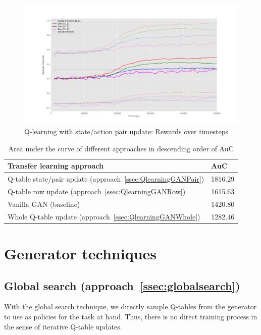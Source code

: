 \begin{figure}[H]
\centering
\includegraphics[width=15cm]{Figures/QlearningGANAllDiscrim}
\caption{Q-learning with state/action pair update: Rewards over timesteps}
\label{fig:QlearningGANAllDiscrim}
\end{figure}


\begin{table}[H]
\centering
\begin{tabular}{@{}ll@{}}
\toprule
Transfer learning approach & AuC     \\ \midrule
Q-table state/pair update (approach~\ref{ssec:QlearningGANPair})  & 1816.29 \\
Q-table row update (approach~\ref{ssec:QlearningGANRow})        & 1615.63 \\
Vanilla GAN (baseline)     & 1420.80 \\
Whole Q-table update (approach~\ref{ssec:QlearningGANWhole})      & 1282.46 \\ \bottomrule
\end{tabular}
\caption{Area under the curve of different approaches in descending order of AuC}
\label{tab:aucdiscrim}
\end{table}

\section{Generator techniques}
\subsection{Global search (approach~\ref{ssec:globalsearch})}
With the global search technique, we directly sample Q-tables from the generator to use as policies for the task at hand. Thus, there is no direct training process in the sense of iterative Q-table updates.

